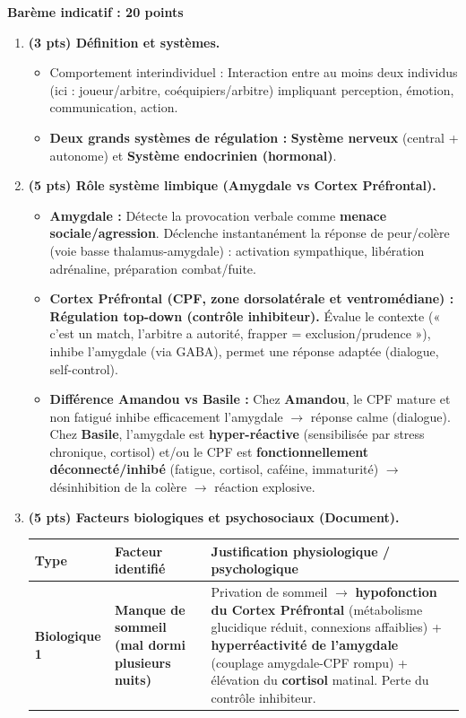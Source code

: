\documentclass[11pt]{article}
\newcommand{\cle}[1]{{\popxbold\color{popdark}#1}}
\begin{document}
\begin{corrige}
\textbf{Barème indicatif : 20 points}
\begin{enumerate}
\item \textbf{(3 pts) Définition et systèmes.}
\begin{itemize}
\item \cle{Comportement interindividuel} : Interaction entre au moins deux individus (ici : joueur/arbitre, coéquipiers/arbitre) impliquant perception, émotion, communication, action.
\item \textbf{Deux grands systèmes de régulation :} \textbf{Système nerveux} (central + autonome) et \textbf{Système endocrinien (hormonal)}.
\end{itemize}
\item \textbf{(5 pts) Rôle système limbique (Amygdale vs Cortex Préfrontal).}
\begin{itemize}
\item \textbf{Amygdale :} Détecte la provocation verbale comme \textbf{menace sociale/agression}. Déclenche instantanément la réponse de peur/colère (voie basse thalamus-amygdale) : activation sympathique, libération adrénaline, préparation combat/fuite.
\item \textbf{Cortex Préfrontal (CPF, zone dorsolatérale et ventromédiane) :} \textbf{Régulation top-down (contrôle inhibiteur).} Évalue le contexte (« c'est un match, l'arbitre a autorité, frapper = exclusion/prudence »), inhibe l'amygdale (via GABA), permet une réponse adaptée (dialogue, self-control).
\item \textbf{Différence Amandou vs Basile :} Chez \textbf{Amandou}, le CPF mature et non fatigué inhibe efficacement l'amygdale $\to$ réponse calme (dialogue). Chez \textbf{Basile}, l'amygdale est \textbf{hyper-réactive} (sensibilisée par stress chronique, cortisol) et/ou le CPF est \textbf{fonctionnellement déconnecté/inhibé} (fatigue, cortisol, caféine, immaturité) $\to$ désinhibition de la colère $\to$ réaction explosive.
\end{itemize}
\item \textbf{(5 pts) Facteurs biologiques et psychosociaux (Document).}
\begin{center}
\begin{tabularx}{\linewidth}{|l|X|X|}
\hline
\rowcolor{popblueL} \textbf{Type} & \textbf{Facteur identifié} & \textbf{Justification physiologique / psychologique} \\
\hline
\textbf{Biologique 1} & \textbf{Manque de sommeil (mal dormi plusieurs nuits)} & Privation de sommeil $\to$ \textbf{hypofonction du Cortex Préfrontal} (métabolisme glucidique réduit, connexions affaiblies) + \textbf{hyperréactivité de l'amygdale} (couplage amygdale-CPF rompu) + élévation du \textbf{cortisol} matinal. Perte du contrôle inhibiteur. \\

\end{tabularx}
\end{center}
\end{enumerate}
\end{corrige}
\end{document}
